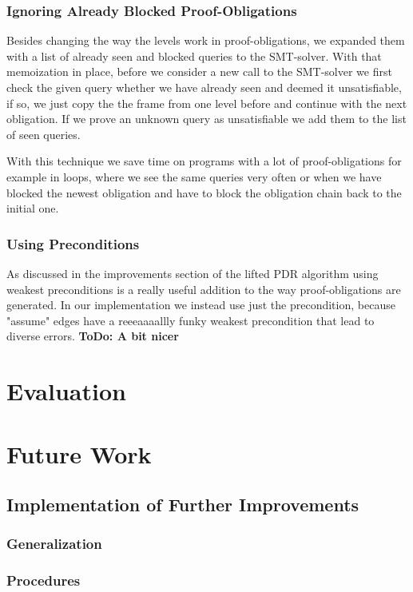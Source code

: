 \documentclass[11pt, a4paper, BCOR=10mm, ngerman, oneside]{scrbook}
\begin{document}
\subsection{Ignoring Already Blocked Proof-Obligations}
Besides changing the way the levels work in proof-obligations, we expanded them with a list of already seen and blocked queries to the SMT-solver. With that memoization in place, before we consider a new call to the SMT-solver we first check the given query whether we have already seen and deemed it unsatisfiable, if so, we just copy the the frame from one level before and continue with the next obligation. If we prove an unknown query as unsatisfiable we add them to the list of seen queries. \\ \par
With this technique we save time on programs with a lot of proof-obligations for example in loops, where we see the same queries very often or when we have blocked the newest obligation and have to block the obligation chain back to the initial one.

\subsection{Using Preconditions}
As discussed in the improvements section of the lifted PDR algorithm using weakest preconditions is a really useful addition to the way proof-obligations are generated. In our implementation we instead use just the precondition, because "assume" edges have a reeeaaaallly funky weakest precondition that lead to diverse errors.
\textbf{ToDo: A bit nicer}


\chapter{Evaluation}


\chapter{Future Work}
\section{Implementation of Further Improvements}
\subsection{Generalization}
\subsection{Procedures}
\end{document}
